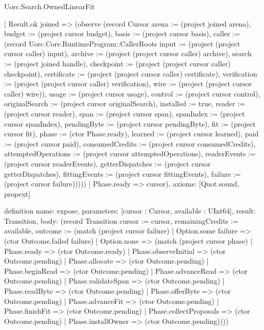 \begin{lexlean}{Uorc.Search.OwnedLinearFit}
\begin{semanticmodule}
{      | Result.ok joined => (observe (record Cursor {arena := (project joined arena), budget := (project cursor budget), basis := (project cursor basis), caller := (record Uorc.Core.RuntimeProgram::CallerRoots {input := (project (project cursor caller) input), archive := (project (project cursor caller) archive), search := (project joined handle), checkpoint := (project (project cursor caller) checkpoint), certificate := (project (project cursor caller) certificate), verification := (project (project cursor caller) verification), wire := (project (project cursor caller) wire)}), usage := (project cursor usage), control := (project cursor control), originalSearch := (project cursor originalSearch), installed := true, reader := (project cursor reader), span := (project cursor span), spanIndex := (project cursor spanIndex), pendingByte := (project cursor pendingByte), fit := (project cursor fit), phase := (ctor Phase.ready), learned := (project cursor learned), paid := (project cursor paid), consumedCredits := (project cursor consumedCredits), attemptedOperations := (project cursor attemptedOperations), readerEvents := (project cursor readerEvents), getterDispatches := (project cursor getterDispatches), fittingEvents := (project cursor fittingEvents), failure := (project cursor failure)}))))
    | Phase.ready => cursor),
  axioms: [Quot.sound, propext]
}

definition{
  name: expose,
  parameters: [cursor : Cursor, available : UInt64],
  result: Transition,
  body: (record Transition {cursor := cursor, remainingCredits := available, outcome := (match (project cursor failure)
    | Option.some failure => (ctor Outcome.failed failure)
    | Option.none => (match (project cursor phase)
      | Phase.ready => (ctor Outcome.ready)
      | Phase.observeInitial => (ctor Outcome.pending)
      | Phase.allocate => (ctor Outcome.pending)
      | Phase.beginRead => (ctor Outcome.pending)
      | Phase.advanceRead => (ctor Outcome.pending)
      | Phase.validateSpan => (ctor Outcome.pending)
      | Phase.readByte => (ctor Outcome.pending)
      | Phase.offerByte => (ctor Outcome.pending)
      | Phase.advanceFit => (ctor Outcome.pending)
      | Phase.finishFit => (ctor Outcome.pending)
      | Phase.collectProposals => (ctor Outcome.pending)
      | Phase.installOwner => (ctor Outcome.pending)))})
}


\end{semanticmodule}
\end{lexlean}
